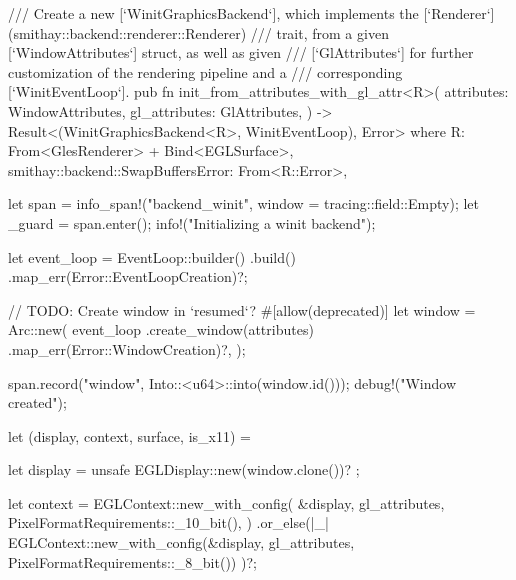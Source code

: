 /// Create a new [`WinitGraphicsBackend`], which implements the [`Renderer`](smithay::backend::renderer::Renderer)
/// trait, from a given [`WindowAttributes`] struct, as well as given
/// [`GlAttributes`] for further customization of the rendering pipeline and a
/// corresponding [`WinitEventLoop`].
pub fn init_from_attributes_with_gl_attr<R>(
    attributes: WindowAttributes,
    gl_attributes: GlAttributes,
) -> Result<(WinitGraphicsBackend<R>, WinitEventLoop), Error>
where
    R: From<GlesRenderer> + Bind<EGLSurface>,
    smithay::backend::SwapBuffersError: From<R::Error>,
{
    let span = info_span!("backend_winit", window = tracing::field::Empty);
    let _guard = span.enter();
    info!("Initializing a winit backend");

    let event_loop = EventLoop::builder()
        .build()
        .map_err(Error::EventLoopCreation)?;

    // TODO: Create window in `resumed`?
    #[allow(deprecated)]
    let window = Arc::new(
        event_loop
            .create_window(attributes)
            .map_err(Error::WindowCreation)?,
    );

    span.record("window", Into::<u64>::into(window.id()));
    debug!("Window created");

    let (display, context, surface, is_x11) = {
        let display = unsafe { EGLDisplay::new(window.clone())? };

        let context = EGLContext::new_with_config(
            &display,
            gl_attributes,
            PixelFormatRequirements::_10_bit(),
        )
        .or_else(|_| {
            EGLContext::new_with_config(&display, gl_attributes, PixelFormatRequirements::_8_bit())
        })?;

}}
